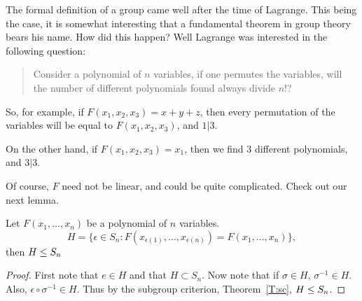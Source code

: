 \documentclass{ximera}
\begin{document}
The formal definition of a group came well after the time of
Lagrange. This being the case, it is somewhat interesting that a
fundamental theorem in group theory bears his name. How did this
happen? Well Lagrange was interested in the following question:


\begin{quote}
  Consider a polynomial of $n$ variables, if one permutes the
  variables, will the number of different polynomials found always
  divide $n!$?
\end{quote}

So, for example, if $F(x_1,x_2,x_3) = x+ y+z$, then every permutation
of the variables will be equal to $F(x_1,x_2,x_3)$, and $1|3$.

On the other hand, if $F(x_1,x_2,x_3) = x_1$, then we find $3$
different polynomials, and $3|3$.

Of course, $F$ need not be linear, and could be quite
complicated. Check out our next lemma.



\begin{lemma}
  Let $F(x_1,\dots,x_n)$ be a polynomial of $n$ variables.
  \[
  H = \{\epsilon\in S_n: F(x_{\epsilon(1)},\dots, x_{\epsilon(n)}) = F(x_1,\dots,x_n)\},
  \]
  then $H\leq S_n$
  \begin{proof}
    First note that $e\in H$ and that $H\subset S_n$. Now note that if
    $\sigma\in H$, $\sigma^{-1}\in H$. Also, $\epsilon\circ \sigma^{-1}\in
    H$. Thus by the subgroup criterion, Theorem~\ref{T:sc}, $H\leq
    S_n$.
  \end{proof}
\end{lemma}
\end{document}
